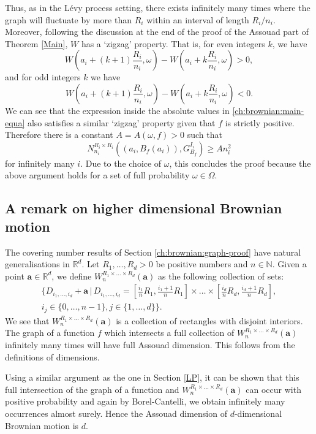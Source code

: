 	Thus, as in the L\'evy process setting, there exists infinitely many times where the graph will fluctuate by more than $R_i$ within an interval of length $R_i/n_i$. Moreover, following the discussion at the end of the proof of the Assouad part of Theorem \ref{Main}, $W$ has a `zigzag' property. That is, for even integers $k$, we have
	\[
	W\left(a_i+(k+1)\frac{R_i}{n_i},\omega\right)-W\left(a_i+k\frac{R_i}{n_i},\omega\right)>0,
	\] 
	and for odd integers $k$ we have
	\[
	W\left(a_i+(k+1)\frac{R_i}{n_i},\omega\right)-W\left(a_i+k\frac{R_i}{n_i},\omega\right)<0.
	\] 
	We can see that the expression inside the absolute values in \eqref{ch:brownian:main-equa} also satisfies a similar `zigzag' property given that $f$ is strictly positive. Therefore there is a constant $A=A(\omega,f)>0$ such that
	\[
	N_{n_i}^{R_i\times R_i} \left( (a_i, B_f(a_i)), G_{B_f}^{I_i} \right) \ge  A n_i^2
	\] 
	for infinitely many $i$. Due to the choice of $\omega$, this concludes the proof because the above argument holds for a set of full probability $\omega\in\Omega$.





\subsection{A remark on higher dimensional Brownian motion}\label{ch-brownian:sec:higher-dim}

The covering number results of Section \ref{ch:brownian:graph-proof} have natural generalisations in $\mathbb{R}^d$. Let $R_1,\dots,R_d>0$ be positive numbers and $n\in \mathbb{N}$. Given a point $\mathbf{a}\in\mathbb{R}^d$, we define $W_{n}^{R_1\times\dots\times R_d}(\mathbf{a})$ as the following collection of sets:
\begin{eqnarray*}
	\Bigg\{D_{i_1,\dots,i_d}+\mathbf{a} \, \vert \, D_{i_1,\dots,i_d}=\left[\frac{i_1}{n}R_1,\frac{i_1+1}{n}R_1\right]\times\dots\times \left[\frac{i_d}{n}R_d,\frac{i_d+1}{n}R_d\right],\\ i_j\in\{0,\dots,n-1\}, j\in\{1,\dots,d\}\Bigg\}.
\end{eqnarray*}
We see that $W_{n}^{R_1\times\dots\times R_d}(\mathbf{a})$ is a collection of rectangles with disjoint interiors. The graph of a function $f$ which intersects a full collection of $W_{n}^{R_1\times\dots\times R_d}(\mathbf{a})$ infinitely many times will have full Assouad dimension. This follows from the definitions of dimensions.

Using a similar argument as the one in Section \ref{LP}, it can be shown that this full intersection of the graph of a function and $W_{n}^{R_1\times\dots\times R_d}(\mathbf{a})$ can occur with positive probability and again by Borel-Cantelli, we obtain infinitely many occurrences almost surely. Hence the Assouad dimension of $d$-dimensional Brownian motion is $d$. 















